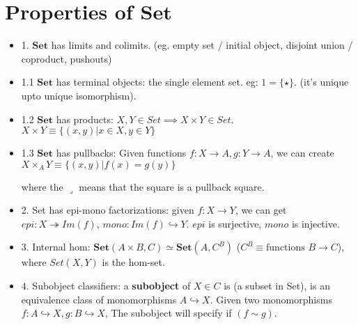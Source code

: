 \documentclass[11pt]{book}
\newcommand{\inj}{\hookrightarrow}
\newcommand{\sur}{\twoheadrightarrow}
\newcommand{\Set}{\ensuremath{\mathbf{Set}} }
\begin{document}
\section{Properties of \Set}
\begin{itemize}
    \item 1. \Set has limits and colimits. (eg. empty set / initial object, disjoint union / coproduct, pushouts)
    \item 1.1 \Set has terminal objects: the single element set. eg: $1 = \{ \star \}$. (it's unique upto unique isomorphism).
    \item 1.2 \Set has products: $X, Y \in Set \implies X \times Y \in Set$. $X \times Y \equiv \{ (x, y) | x \in X, y \in Y \}$
    \item 1.3 \Set has pullbacks: Given functions $f : X \to A, g: Y \to A$, we can create 
                $X \times_A Y \equiv \{ (x, y) | f(x) = g(y) \}$

        where the $\lrcorner$ means that the square is a pullback square.

    \item 2. Set has epi-mono factorizations: given $f: X \to Y$, we can get
        $epi: X \sur Im(f)$, $mono: Im(f) \inj Y$. $epi$ is surjective, $mono$ is injective.

    \item 3. Internal hom: $\Set(A \times B, C) \simeq \Set(A, C^B)$ ($C^B \equiv \text{functions $B \to C$}$),
        where $Set(X, Y)$ is the hom-set.
    \item 4. Subobject classifiers: a \textbf{subobject} of $X \in C$ is (a subset in Set), 
        is an equivalence class of monomorphisms $A \hookrightarrow X$. 
        Given two monomorphisms $f: A \inj X, g: B \inj X$, The subobject will specify if $(f \sim g)$.



\end{itemize}
\end{document}
